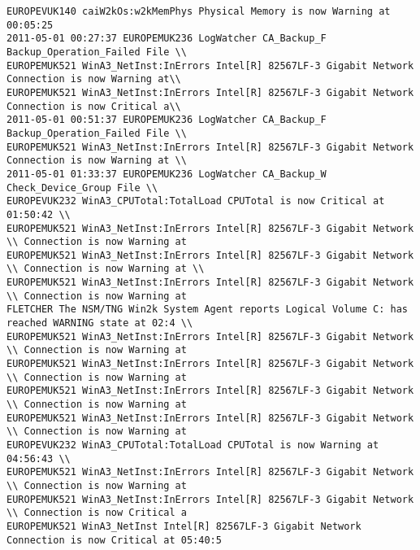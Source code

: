 \begin{lstlisting}
EUROPEVUK140 caiW2kOs:w2kMemPhys Physical Memory is now Warning at 00:05:25
2011-05-01 00:27:37 EUROPEMUK236 LogWatcher CA_Backup_F Backup_Operation_Failed File \\
EUROPEMUK521 WinA3_NetInst:InErrors Intel[R] 82567LF-3 Gigabit Network Connection is now Warning at\\
EUROPEMUK521 WinA3_NetInst:InErrors Intel[R] 82567LF-3 Gigabit Network Connection is now Critical a\\
2011-05-01 00:51:37 EUROPEMUK236 LogWatcher CA_Backup_F Backup_Operation_Failed File \\
EUROPEMUK521 WinA3_NetInst:InErrors Intel[R] 82567LF-3 Gigabit Network Connection is now Warning at \\
2011-05-01 01:33:37 EUROPEMUK236 LogWatcher CA_Backup_W Check_Device_Group File \\
EUROPEVUK232 WinA3_CPUTotal:TotalLoad CPUTotal is now Critical at 01:50:42 \\
EUROPEMUK521 WinA3_NetInst:InErrors Intel[R] 82567LF-3 Gigabit Network \\ Connection is now Warning at 
EUROPEMUK521 WinA3_NetInst:InErrors Intel[R] 82567LF-3 Gigabit Network \\ Connection is now Warning at \\
EUROPEMUK521 WinA3_NetInst:InErrors Intel[R] 82567LF-3 Gigabit Network \\ Connection is now Warning at 
FLETCHER The NSM/TNG Win2k System Agent reports Logical Volume C: has reached WARNING state at 02:4 \\
EUROPEMUK521 WinA3_NetInst:InErrors Intel[R] 82567LF-3 Gigabit Network \\ Connection is now Warning at
EUROPEMUK521 WinA3_NetInst:InErrors Intel[R] 82567LF-3 Gigabit Network \\ Connection is now Warning at
EUROPEMUK521 WinA3_NetInst:InErrors Intel[R] 82567LF-3 Gigabit Network \\ Connection is now Warning at
EUROPEMUK521 WinA3_NetInst:InErrors Intel[R] 82567LF-3 Gigabit Network \\ Connection is now Warning at
EUROPEVUK232 WinA3_CPUTotal:TotalLoad CPUTotal is now Warning at 04:56:43 \\ 
EUROPEMUK521 WinA3_NetInst:InErrors Intel[R] 82567LF-3 Gigabit Network \\ Connection is now Warning at
EUROPEMUK521 WinA3_NetInst:InErrors Intel[R] 82567LF-3 Gigabit Network \\ Connection is now Critical a
EUROPEMUK521 WinA3_NetInst Intel[R] 82567LF-3 Gigabit Network Connection is now Critical at 05:40:5 

\end{lstlisting}

